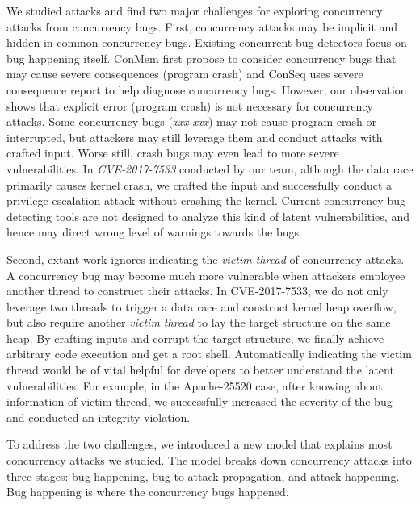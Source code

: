 We studied \nattacks attacks and find two major challenges for exploring concurrency attacks from concurrency bugs. 
First, concurrency attacks may be implicit and hidden in common concurrency bugs. 
Existing concurrent bug detectors focus on bug happening itself. 
ConMem\cite{conmem:asplos10} first propose to 
consider concurrency bugs that may cause severe consequences (\eg program crash)
and ConSeq\cite{conseq:asplos11} uses severe consequence report to help diagnose concurrency bugs. 
However, our observation shows that explicit error (\eg program crash) is not necessary for concurrency 
attacks. Some concurrency bugs (\eg \emph{xxx-xxx}) may not cause program crash or interrupted, 
but attackers may still leverage them and conduct attacks with crafted input. 
%
Worse still, crash bugs may even lead to more severe vulnerabilities. 
In \emph{CVE-2017-7533} conducted by our team, although the data race primarily causes kernel crash, 
we crafted the input and successfully conduct a privilege escalation attack without crashing the kernel.
Current concurrency bug detecting tools are not designed to analyze this kind of latent vulnerabilities, 
and hence may direct wrong level of warnings towards the bugs.  


Second, extant work ignores indicating the \emph{victim thread} of concurrency attacks.
A concurrency bug may become much more vulnerable when attackers employee another thread to construct 
their attacks. 
In CVE-2017-7533, we do not only leverage two threads to trigger a data race and construct kernel heap overflow, 
but also require another \emph{victim thread} to lay the target structure on the same heap. 
By crafting inputs and corrupt the target structure, we finally achieve arbitrary code execution and get a root shell. 
Automatically indicating the victim thread would be of vital helpful for developers to better understand the latent vulnerabilities.
For example, in the Apache-25520 case, after knowing about information of victim thread, 
we successfully increased the severity of the bug and conducted an integrity violation.


To address the two challenges, we introduced a new model that explains most concurrency attacks we studied. 
The model breaks down concurrency attacks into three stages: bug happening, bug-to-attack propagation, 
and attack happening. Bug happening is where the concurrency bugs happened. 


